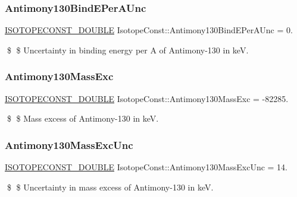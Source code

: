 \subsubsection{\texorpdfstring{Antimony130\+Bind\+E\+Per\+A\+Unc}{Antimony130BindEPerAUnc}}
{\footnotesize\ttfamily \mbox{\hyperlink{group___isotope_const-_macros_ga8f45a7272ce02c0b4c65c44636ed719a}{I\+S\+O\+T\+O\+P\+E\+C\+O\+N\+S\+T\+\_\+\+D\+O\+U\+B\+LE}} Isotope\+Const\+::\+Antimony130\+Bind\+E\+Per\+A\+Unc = 0.}

\$ \$ Uncertainty in binding energy per A of Antimony-\/130 in keV. \mbox{\label{group___isotope_const-_antimony-_sb130_ga4a988d9bdce5561cc14f875bd72038d5}} 
\subsubsection{\texorpdfstring{Antimony130\+Mass\+Exc}{Antimony130MassExc}}
{\footnotesize\ttfamily \mbox{\hyperlink{group___isotope_const-_macros_ga8f45a7272ce02c0b4c65c44636ed719a}{I\+S\+O\+T\+O\+P\+E\+C\+O\+N\+S\+T\+\_\+\+D\+O\+U\+B\+LE}} Isotope\+Const\+::\+Antimony130\+Mass\+Exc = -\/82285.}

\$ \$ Mass excess of Antimony-\/130 in keV. \mbox{\label{group___isotope_const-_antimony-_sb130_ga71608db3ebc838d7836443599691b03f}} 
\subsubsection{\texorpdfstring{Antimony130\+Mass\+Exc\+Unc}{Antimony130MassExcUnc}}
{\footnotesize\ttfamily \mbox{\hyperlink{group___isotope_const-_macros_ga8f45a7272ce02c0b4c65c44636ed719a}{I\+S\+O\+T\+O\+P\+E\+C\+O\+N\+S\+T\+\_\+\+D\+O\+U\+B\+LE}} Isotope\+Const\+::\+Antimony130\+Mass\+Exc\+Unc = 14.}

\$ \$ Uncertainty in mass excess of Antimony-\/130 in keV. \mbox{\label{group___isotope_const-_antimony-_sb130_gad5567787445c3b5aaab33ed25569aeb3}} 
